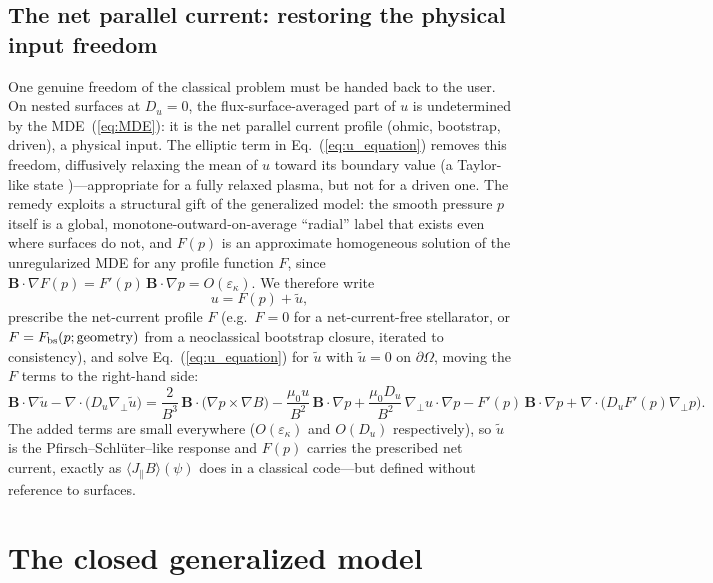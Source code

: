 \documentclass[english]{article}
\newcommand{\bB}{\mathbf{B}}
\newcommand{\gradperp}{\nabla_{\!\perp}}
\begin{document}
\subsection{The net parallel current: restoring the physical input freedom}
\label{sec:net_current}

One genuine freedom of the classical problem must be handed back to the user. On nested surfaces at
$D_u=0$, the flux-surface-averaged part of $u$ is undetermined by the MDE~(\ref{eq:MDE}): it is the
net parallel current profile (ohmic, bootstrap, driven), a physical input. The elliptic term in
Eq.~(\ref{eq:u_equation}) removes this freedom, diffusively relaxing the mean of $u$ toward its
boundary value (a Taylor-like state \cite{boozer1986})---appropriate for a fully relaxed plasma,
but not for a driven one. The remedy exploits a structural gift of the generalized model: the
smooth pressure $p$ itself is a global, monotone-outward-on-average ``radial'' label that exists
even where surfaces do not, and $F(p)$ is an approximate homogeneous solution of the unregularized
MDE for any profile function $F$, since $\bB\cdot\nabla F(p)=F'(p)\,\bB\cdot\nabla
p=O(\varepsilon_\kappa)$. We therefore write
\begin{equation}
u=F(p)+\tilde u ,
\label{eq:u_split}
\end{equation}
prescribe the net-current profile $F$ (e.g.\ $F=0$ for a net-current-free stellarator, or
$F=F_{\rm bs}(p;\text{geometry})$ from a neoclassical bootstrap closure, iterated to consistency),
and solve Eq.~(\ref{eq:u_equation}) for $\tilde u$ with $\tilde u=0$ on $\partial\Omega$, moving
the $F$ terms to the right-hand side:
\begin{equation}
\bB\cdot\nabla\tilde u-\nabla\cdot\big(D_u\gradperp\tilde u\big)
=\frac{2}{B^{3}}\,\bB\cdot\big(\nabla p\times\nabla B\big)
-\frac{\mu_0 u}{B^{2}}\,\bB\cdot\nabla p
+\frac{\mu_0 D_u}{B^{2}}\,\gradperp u\cdot\nabla p
-F'(p)\,\bB\cdot\nabla p
+\nabla\cdot\big(D_u F'(p)\gradperp p\big) .
\label{eq:utilde_equation}
\end{equation}
The added terms are small everywhere ($O(\varepsilon_\kappa)$ and $O(D_u)$ respectively), so
$\tilde u$ is the Pfirsch--Schl\"uter--like response and $F(p)$ carries the prescribed net current,
exactly as $\langle J_\parallel B\rangle(\psi)$ does in a classical code---but defined without
reference to surfaces.

\section{The closed generalized model}
\label{sec:model}
\end{document}
